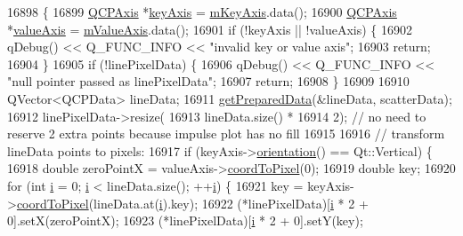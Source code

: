 \begin{DoxyCode}
16898                                                                        \{
16899   \hyperlink{class_q_c_p_axis}{QCPAxis} *\hyperlink{class_q_c_p_abstract_plottable_a72c7a09c22963f2c943f07112b311103}{keyAxis} = \hyperlink{class_q_c_p_abstract_plottable_a426f42e254d0f8ce5436a868c61a6827}{mKeyAxis}.data();
16900   \hyperlink{class_q_c_p_axis}{QCPAxis} *\hyperlink{class_q_c_p_abstract_plottable_a3106f9d34d330a6097a8ec5905e5b519}{valueAxis} = \hyperlink{class_q_c_p_abstract_plottable_a2901452ca4aea911a1827717934a4bda}{mValueAxis}.data();
16901   \textcolor{keywordflow}{if} (!keyAxis || !valueAxis) \{
16902     qDebug() << Q\_FUNC\_INFO << \textcolor{stringliteral}{"invalid key or value axis"};
16903     \textcolor{keywordflow}{return};
16904   \}
16905   \textcolor{keywordflow}{if} (!linePixelData) \{
16906     qDebug() << Q\_FUNC\_INFO << \textcolor{stringliteral}{"null pointer passed as linePixelData"};
16907     \textcolor{keywordflow}{return};
16908   \}
16909 
16910   QVector<QCPData> lineData;
16911   \hyperlink{class_q_c_p_graph_ab420b46ba638dc3252439fe16687b244}{getPreparedData}(&lineData, scatterData);
16912   linePixelData->resize(
16913       lineData.size() *
16914       2); \textcolor{comment}{// no need to reserve 2 extra points because impulse plot has no fill}
16915 
16916   \textcolor{comment}{// transform lineData points to pixels:}
16917   \textcolor{keywordflow}{if} (keyAxis->\hyperlink{class_q_c_p_axis_a57483f2f60145ddc9e63f3af53959265}{orientation}() == Qt::Vertical) \{
16918     \textcolor{keywordtype}{double} zeroPointX = valueAxis->\hyperlink{class_q_c_p_axis_a985ae693b842fb0422b4390fe36d299a}{coordToPixel}(0);
16919     \textcolor{keywordtype}{double} key;
16920     \textcolor{keywordflow}{for} (\textcolor{keywordtype}{int} \hyperlink{_comparision_pictures_2_createtest_image_8m_a6f6ccfcf58b31cb6412107d9d5281426}{i} = 0; \hyperlink{_comparision_pictures_2_createtest_image_8m_a6f6ccfcf58b31cb6412107d9d5281426}{i} < lineData.size(); ++\hyperlink{_comparision_pictures_2_createtest_image_8m_a6f6ccfcf58b31cb6412107d9d5281426}{i}) \{
16921       key = keyAxis->\hyperlink{class_q_c_p_axis_a985ae693b842fb0422b4390fe36d299a}{coordToPixel}(lineData.at(\hyperlink{_comparision_pictures_2_createtest_image_8m_a6f6ccfcf58b31cb6412107d9d5281426}{i}).key);
16922       (*linePixelData)[\hyperlink{_comparision_pictures_2_createtest_image_8m_a6f6ccfcf58b31cb6412107d9d5281426}{i} * 2 + 0].setX(zeroPointX);
16923       (*linePixelData)[\hyperlink{_comparision_pictures_2_createtest_image_8m_a6f6ccfcf58b31cb6412107d9d5281426}{i} * 2 + 0].setY(key);

\end{DoxyCode}

